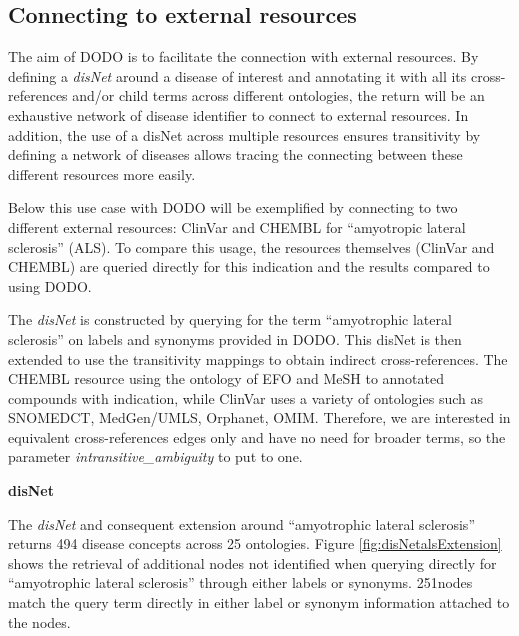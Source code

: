 \documentclass[9pt,a4paper,]{extarticle}
\begin{document}
\hypertarget{connecting-to-external-resources}{%
\subsection{Connecting to external resources}\label{connecting-to-external-resources}}

The aim of DODO is to facilitate the connection with external resources. By defining a \emph{disNet} around a disease of interest and annotating it with all its cross-references and/or child terms across different ontologies, the return will be an exhaustive network of disease identifier to connect to external resources. In addition, the use of a disNet across multiple resources ensures transitivity by defining a network of diseases allows tracing the connecting between these different resources more easily.

Below this use case with DODO will be exemplified by connecting to two different external resources: ClinVar and CHEMBL for ``amyotropic lateral sclerosis'' (ALS). To compare this usage, the resources themselves (ClinVar and CHEMBL) are queried directly for this indication and the results compared to using DODO.

The \emph{disNet} is constructed by querying for the term ``amyotrophic lateral sclerosis'' on labels and synonyms provided in DODO. This disNet is then extended to use the transitivity mappings to obtain indirect cross-references. The CHEMBL resource using the ontology of EFO and MeSH to annotated compounds with indication, while ClinVar uses a variety of ontologies such as SNOMEDCT, MedGen/UMLS, Orphanet, OMIM. Therefore, we are interested in equivalent cross-references edges only and have no need for broader terms, so the parameter \emph{intransitive\_ambiguity} to put to one.

\textbf{disNet}

The \emph{disNet} and consequent extension around ``amyotrophic lateral sclerosis'' returns 494 disease concepts across 25 ontologies. Figure \ref{fig:disNetalsExtension} shows the retrieval of additional nodes not identified when querying directly for ``amyotrophic lateral sclerosis'' through either labels or synonyms. 251nodes match the query term directly in either label or synonym information attached to the nodes.
\end{document}

